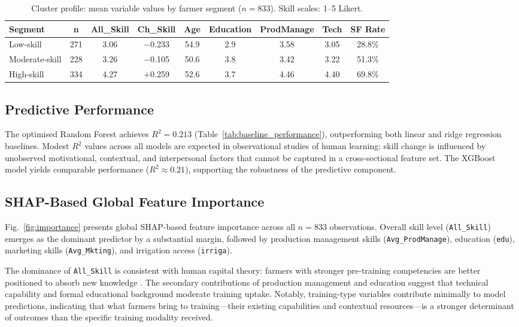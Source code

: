 \documentclass[3p,twocolumn,authoryear]{elsarticle}
\begin{document}
\begin{table}[htbp]
\centering
\caption{Cluster profile: mean variable values by farmer segment
         ($n = 833$). Skill scales: 1--5 Likert.}
\label{tab:cluster_profile}
\begin{tabular}{@{}lcccccccc@{}}
\toprule
\textbf{Segment} & \textbf{n} & \textbf{All\_Skill}
  & \textbf{Ch\_Skill} & \textbf{Age}
  & \textbf{Education} & \textbf{ProdManage}
  & \textbf{Tech} & \textbf{SF Rate} \\
\midrule
Low-skill      & 271 & 3.06 & $-$0.233 & 54.9 & 2.9 & 3.58 & 3.05 & 28.8\% \\
Moderate-skill & 228 & 3.26 & $-$0.105 & 50.6 & 3.8 & 3.42 & 3.22 & 51.3\% \\
High-skill     & 334 & 4.27 & $+$0.259 & 52.6 & 3.7 & 4.46 & 4.40 & 69.8\% \\
\bottomrule
\end{tabular}
\end{table}

\subsection{Predictive Performance}

The optimised Random Forest achieves $R^{2} = 0.213$
(Table~\ref{tab:baseline_performance}), outperforming both
linear and ridge regression baselines.
Modest $R^{2}$ values across all models are expected in
observational studies of human learning: skill change is
influenced by unobserved motivational, contextual, and
interpersonal factors that cannot be captured in a
cross-sectional feature set.
The XGBoost model yields comparable performance
($R^{2} \approx 0.21$), supporting the robustness of the
predictive component.

\subsection{SHAP-Based Global Feature Importance}

Fig.~\ref{fig:importance} presents global SHAP-based feature
importance across all $n = 833$ observations.
Overall skill level (\texttt{All\_Skill}) emerges as the
dominant predictor by a substantial margin, followed by
production management skills (\texttt{Avg\_ProdManage}),
education (\texttt{edu}), marketing skills
(\texttt{Avg\_Mkting}), and irrigation access
(\texttt{irriga}).

The dominance of \texttt{All\_Skill} is consistent with
human capital theory: farmers with stronger pre-training
competencies are better positioned to absorb new knowledge
\citep{feder1985}.
The secondary contributions of production management and
education suggest that technical capability and formal
educational background moderate training uptake.
Notably, training-type variables contribute minimally to
model predictions, indicating that what farmers bring to
training---their existing capabilities and contextual
resources---is a stronger determinant of outcomes than the
specific training modality received.
\end{document}
